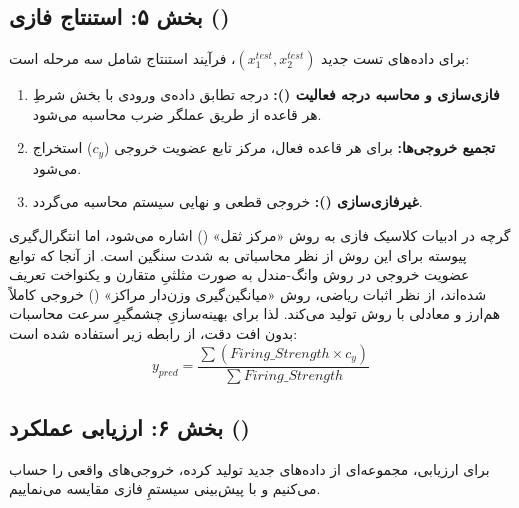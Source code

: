 \documentclass{article}
\begin{document}
\subsection{بخش ۵: استنتاج فازی ()}

برای داده‌های تست جدید $(x_1^{test}, x_2^{test})$، فرآیند استنتاج شامل سه مرحله است:
\begin{enumerate}
	\item \textbf{فازی‌سازی و محاسبه درجه فعالیت ():} درجه تطابق داده‌ی ورودی با بخش شرطِ هر قاعده از طریق عملگر ضرب محاسبه می‌شود.
	\item \textbf{تجميع خروجی‌ها:} برای هر قاعده فعال، مرکز تابع عضویت خروجی ($c_y$) استخراج می‌شود.
	\item \textbf{غیرفازی‌سازی ():} خروجی قطعی و نهایی سیستم محاسبه می‌گردد.
\end{enumerate}

\begin{tcolorbox}[
	colback=lightmutedpurple,
	colframe=mutedpurple,
	title=دفاعیه مهندسی: انتخاب \lr{Center of Average} به جای \lr{Centroid},
	fonttitle=\bfseries\large,
	coltitle=white,
	arc=3mm
	]
	گرچه در ادبیات کلاسیک فازی به روش «مرکز ثقل» () اشاره می‌شود، اما انتگرال‌گیری پیوسته برای این روش از نظر محاسباتی به شدت سنگین است. از آنجا که توابع عضویت خروجی در روش وانگ-مندل به صورت مثلثیِ متقارن و یکنواخت تعریف شده‌اند، از نظر اثبات ریاضی، روش «میانگین‌گیری وزن‌دار مراکز» () خروجی کاملاً هم‌ارز و معادلی با روش  تولید می‌کند. لذا برای بهینه‌سازیِ چشمگیرِ سرعت محاسبات بدون افت دقت، از رابطه زیر استفاده شده است:
	$$ y_{pred} = \frac{\sum (Firing\_Strength \times c_y)}{\sum Firing\_Strength} $$
\end{tcolorbox}

\subsection{بخش ۶: ارزیابی عملکرد ()}

برای ارزیابی، مجموعه‌ای از داده‌های جدید تولید کرده، خروجی‌های واقعی را حساب می‌کنیم و با پیش‌بینی سیستمِ فازی  مقایسه می‌نماییم.
\end{document}
